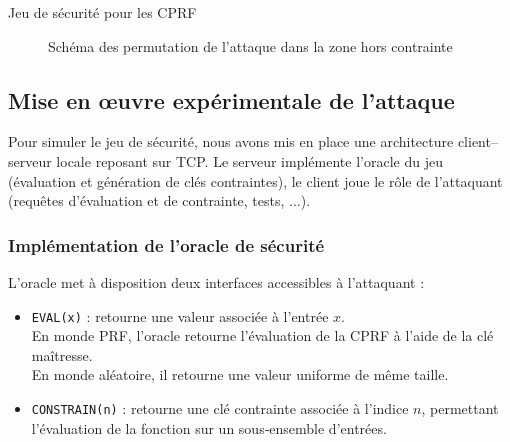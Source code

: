 \documentclass[9pt]{extarticle}
\begin{document}
\begin{defbox}{Jeu de sécurité pour les CPRF}
\begin{figure}[H]
\caption{Schéma des permutation de l'attaque dans la zone hors contrainte}
\end{figure}




\end{defbox}

\subsection{Mise en œuvre expérimentale de l’attaque}

Pour simuler le jeu de sécurité, nous avons mis en place une architecture client–serveur locale 
reposant sur TCP. Le serveur implémente l’oracle du jeu 
(évaluation et génération de clés contraintes), 
le client joue le rôle de l’attaquant (requêtes d’évaluation et de contrainte, tests, ...).


\subsubsection{Implémentation de l’oracle de sécurité}


L’oracle met à disposition deux interfaces accessibles à l’attaquant :
\begin{itemize}
    \item \texttt{EVAL(x)} : retourne une valeur associée à l’entrée $x$.\\
    En monde PRF, l’oracle retourne l’évaluation de la CPRF à l’aide de la clé maîtresse.\\
    En monde aléatoire, il retourne une valeur uniforme de même taille.

    \item \texttt{CONSTRAIN(n)} : retourne une clé contrainte associée à l’indice $n$,
    permettant l’évaluation de la fonction sur un sous‑ensemble d’entrées.
\end{itemize}
\end{document}
